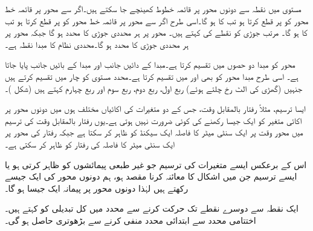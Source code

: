 مستوی میں نقطہ  سے دونوں محور پر قائمہ خطوط کھینچے جا سکتے ہیں۔اگر  سے  محور پر قائمہ خط  محور کو  پر قطع کرتا ہو تب  کا   ہو گا۔اسی طرح اگر  سے  محور پر قائمہ خط  محور کو  پر قطع کرتا ہو تب  کا   ہو گا۔  مرتب جوڑی  کو نقطے کی  کہتے ہیں۔ محور پر ہر محددی جوڑی کا  محدد  ہو گا جبکہ  محور پر ہر محددی جوڑی کا  محدد  ہو گا۔محددی نظام کا مبدا نقطہ  ہے۔ 

محور   کو مبدا دو حصوں میں تقسیم کرتا ہے۔مبدا کے دائیں جانب  اور مبدا کے بائیں جانب  پایا جاتا ہے۔ اسی طرح مبدا  محور کو بھی  اور  میں تقسیم کرتا ہے۔محدد مستوی کو چار  میں تقسیم کرتے ہیں جنہیں (گھڑی کی الٹ رخ چلتے ہوئے) ربع اول، ربع دوم، ربع سوم اور ربع چہارم کہتے ہیں (شکل )۔

ایسا ترسیم، مثلاً رفتار بالمقابل وقت، جس کے دو متغیرات کی اکائیاں مختلف ہوں میں دونوں محور پر اکائی متغیر کو ایک جیسا رکھنے کی کوئی ضرورت نہیں ہوتی ہے۔یوں رفتار بالمقابل وقت کی ترسیم میں محور وقت پر ایک سنٹی میٹر کا فاصلہ ایک سیکنڈ کو ظاہر کر سکتا ہے جبکہ رفتار کی محور پر ایک سنٹی میٹر کا فاصلہ  کی رفتار کو ظاہر کر سکتی ہے۔

اس کے برعکس ایسے متغیرات کی ترسیم جو غیر طبعی پیمائشوں کو ظاہر کرتی ہو یا ایسے ترسیم جن میں اشکال کا معائنہ کرنا مقصد ہو، ہم دونوں محور کی  ایک جیسے رکھتے ہیں لہٰذا دونوں محور پر پیمانہ ایک جیسا ہو گا۔

ایک نقطہ سے دوسرے نقطے تک حرکت کرنے سے محدد میں کل تبدیلی کو  کہتے ہیں۔ اختتامی محدد سے ابتدائی محدد منفی کرنے سے بڑھوتری حاصل ہو گی۔

